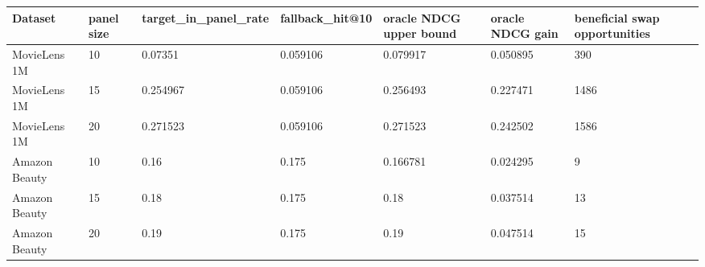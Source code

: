 \begin{tabular}{lllllll}
\toprule
Dataset & panel size & target\_in\_panel\_rate & fallback\_hit@10 & oracle NDCG upper bound & oracle NDCG gain & beneficial swap opportunities \\
\midrule
MovieLens 1M & 10 & 0.07351 & 0.059106 & 0.079917 & 0.050895 & 390 \\
MovieLens 1M & 15 & 0.254967 & 0.059106 & 0.256493 & 0.227471 & 1486 \\
MovieLens 1M & 20 & 0.271523 & 0.059106 & 0.271523 & 0.242502 & 1586 \\
Amazon Beauty & 10 & 0.16 & 0.175 & 0.166781 & 0.024295 & 9 \\
Amazon Beauty & 15 & 0.18 & 0.175 & 0.18 & 0.037514 & 13 \\
Amazon Beauty & 20 & 0.19 & 0.175 & 0.19 & 0.047514 & 15 \\
\bottomrule
\end{tabular}
